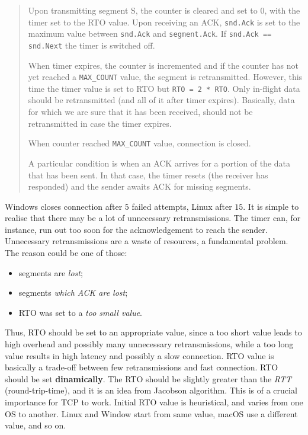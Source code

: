 \documentclass[a4paper, 11pt]{report}
\begin{document}
\begin{quote}
Upon transmitting segment S, the counter is cleared and set to $0$, with the
timer set to the RTO value. Upon receiving an ACK, \texttt{snd.Ack} is set to
the maximum value between \texttt{snd.Ack} and \texttt{segment.Ack}. If
\texttt{snd.Ack == snd.Next} the timer is switched off.

When timer expires, the counter is incremented and if the counter has not yet
reached a \texttt{MAX\_COUNT} value, the segment is retransmitted. However, this
time the timer value is set to RTO but \texttt{RTO = 2 * RTO}. Only in-flight data
should be retransmitted (and all of it after timer expires). Basically, data
for which we are sure that it has been received, should not be retransmitted in
case the timer expires.

When counter reached \texttt{MAX\_COUNT} value, connection is closed.

A particular condition is when an ACK arrives for a portion of the data that
has been sent. In that case, the timer resets (the receiver has responded) and
the sender awaits ACK for missing segments.
\end{quote}

Windows closes connection after $5$ failed attempts, Linux after $15$. It is
simple to realise that there may be a lot of unnecessary retransmissions. The
timer can, for instance, run out too soon for the acknowledgement to reach the
sender. Unnecessary retransmissions are a waste of resources, a fundamental
problem. The reason could be one of those:

\begin{itemize}
    \item segments are \emph{lost};
    \item segments \emph{which ACK are lost};
    \item RTO was set to a \emph{too small value}.
\end{itemize}

Thus, RTO should be set to an appropriate value, since a too short value leads
to high overhead and possibly many unnecessary retransmissions, while a too
long value results in high latency and possibly a slow connection. RTO value is
basically a trade-off between few retransmissions and fast connection. RTO
should be set \textbf{dinamically}. The RTO should be slightly greater than the
\emph{RTT} (round-trip-time), and it is an idea from Jacobson algorithm. This
is of a crucial importance for TCP to work. Initial RTO value is heuristical,
and varies from one OS to another. Linux and Window start from same value,
macOS use a different value, and so on.
\end{document}
